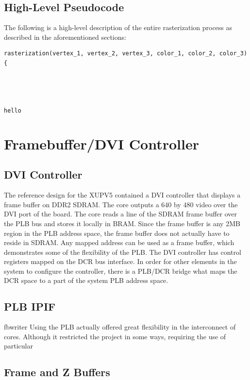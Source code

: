 \documentclass[letterpaper,10pt]{article}
\begin{document}
\subsection{High-Level Pseudocode}

The following is a high-level description of the entire rasterization process as described in the aforementioned sections:

\begin{verbatim}
rasterization(vertex_1, vertex_2, vertex_3, color_1, color_2, color_3) {
	



hello
\end{verbatim}
\section{Framebuffer/DVI Controller}

\subsection{DVI Controller}
The reference design for the XUPV5 contained a DVI controller that displays a frame buffer on DDR2 SDRAM.  The core outputs a 640 by 480 video over the DVI port of the board.  The core reads a line of the SDRAM frame buffer over the PLB bus and stores it locally in BRAM. Since the frame buffer is any 2MB region in the PLB address space, the frame buffer does not actually have to reside in SDRAM.  Any mapped address can be used as a frame buffer, which demonstrates some of the flexibility of the PLB.  The DVI controller has control registers mapped on the DCR bus interface.  In order for other elements in the system to configure the controller, there is a PLB/DCR bridge what maps the DCR space to a part of the system PLB address space.


\subsection{PLB IPIF}
fbwriter
Using the PLB actually offered great flexibility in the interconnect of cores.  Although it restricted the project in some ways, requiring the use of particular 

\subsection{Frame and Z Buffers}
\end{document}
